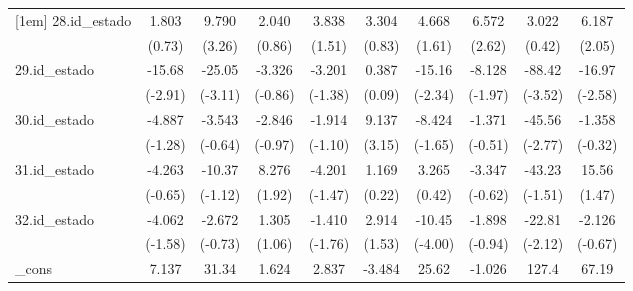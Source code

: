 {\begin{tabular}{l*{9}{c}}
[1em]
28.id\_estado&       1.803         &       9.790\sym{**} &       2.040         &       3.838         &       3.304         &       4.668         &       6.572\sym{**} &       3.022         &       6.187\sym{*}  \\
            &      (0.73)         &      (3.26)         &      (0.86)         &      (1.51)         &      (0.83)         &      (1.61)         &      (2.62)         &      (0.42)         &      (2.05)         \\
[1em]
29.id\_estado&      -15.68\sym{**} &      -25.05\sym{**} &      -3.326         &      -3.201         &       0.387         &      -15.16\sym{*}  &      -8.128\sym{*}  &      -88.42\sym{***}&      -16.97\sym{*}  \\
            &     (-2.91)         &     (-3.11)         &     (-0.86)         &     (-1.38)         &      (0.09)         &     (-2.34)         &     (-1.97)         &     (-3.52)         &     (-2.58)         \\
[1em]
30.id\_estado&      -4.887         &      -3.543         &      -2.846         &      -1.914         &       9.137\sym{**} &      -8.424         &      -1.371         &      -45.56\sym{**} &      -1.358         \\
            &     (-1.28)         &     (-0.64)         &     (-0.97)         &     (-1.10)         &      (3.15)         &     (-1.65)         &     (-0.51)         &     (-2.77)         &     (-0.32)         \\
[1em]
31.id\_estado&      -4.263         &      -10.37         &       8.276         &      -4.201         &       1.169         &       3.265         &      -3.347         &      -43.23         &       15.56         \\
            &     (-0.65)         &     (-1.12)         &      (1.92)         &     (-1.47)         &      (0.22)         &      (0.42)         &     (-0.62)         &     (-1.51)         &      (1.47)         \\
[1em]
32.id\_estado&      -4.062         &      -2.672         &       1.305         &      -1.410         &       2.914         &      -10.45\sym{***}&      -1.898         &      -22.81\sym{*}  &      -2.126         \\
            &     (-1.58)         &     (-0.73)         &      (1.06)         &     (-1.76)         &      (1.53)         &     (-4.00)         &     (-0.94)         &     (-2.12)         &     (-0.67)         \\
[1em]
\_cons      &       7.137         &       31.34\sym{**} &       1.624         &       2.837         &      -3.484         &       25.62         &      -1.026         &       127.4\sym{***}&       67.19\sym{***}\\

\end{tabular}}

